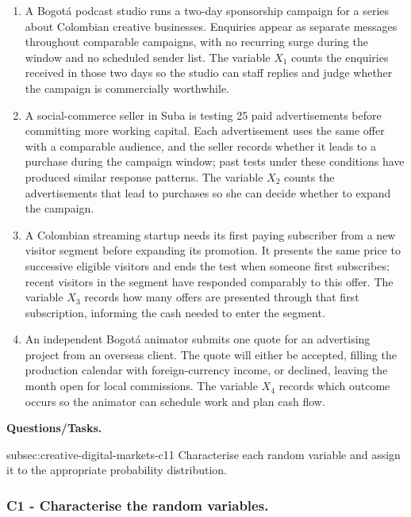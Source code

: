 	\begin{enumerate}
		\item A Bogotá podcast studio runs a two-day sponsorship campaign for a series about Colombian creative businesses. Enquiries appear as separate messages throughout comparable campaigns, with no recurring surge during the window and no scheduled sender list. The variable \(X_1\) counts the enquiries received in those two days so the studio can staff replies and judge whether the campaign is commercially worthwhile.
		\item A social-commerce seller in Suba is testing 25 paid advertisements before committing more working capital. Each advertisement uses the same offer with a comparable audience, and the seller records whether it leads to a purchase during the campaign window; past tests under these conditions have produced similar response patterns. The variable \(X_2\) counts the advertisements that lead to purchases so she can decide whether to expand the campaign.
		\item A Colombian streaming startup needs its first paying subscriber from a new visitor segment before expanding its promotion. It presents the same price to successive eligible visitors and ends the test when someone first subscribes; recent visitors in the segment have responded comparably to this offer. The variable \(X_3\) records how many offers are presented through that first subscription, informing the cash needed to enter the segment.
		\item An independent Bogotá animator submits one quote for an advertising project from an overseas client. The quote will either be accepted, filling the production calendar with foreign-currency income, or declined, leaving the month open for local commissions. The variable \(X_4\) records which outcome occurs so the animator can schedule work and plan cash flow.
	\end{enumerate}

	\textbf{Questions/Tasks.}
	\begin{enumerate}
		\CriterionTask
		{subsec:creative-digital-markets-c1}{1}
		{Characterise each random variable and assign it to the appropriate probability distribution.}
	\end{enumerate}

	\subsubsection*{C1 - Characterise the random variables.}
	\label{subsec:creative-digital-markets-c1}

